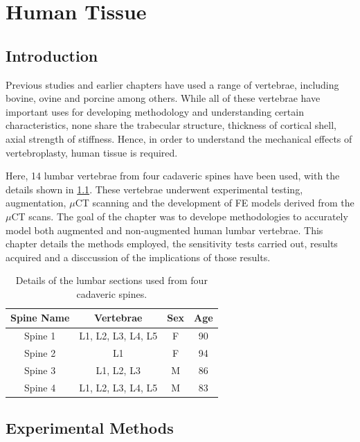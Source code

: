 \chapter{Human Tissue} \label{Chapter_HT}

\section{Introduction}

Previous studies and earlier chapters have used a range of vertebrae, including
bovine, ovine and porcine among others. While all of these vertebrae have
important uses for developing methodology and understanding certain
characteristics, none share the trabecular structure, thickness of cortical
shell, axial strength of stiffness. Hence, in order to understand the
mechanical effects of vertebroplasty, human tissue is required.

Here, 14 lumbar vertebrae from four cadaveric spines have been used, with the
details shown in \cref{tab:vertebrae}. These vertebrae underwent experimental
testing, augmentation, $\mu$CT scanning and the development of FE models
derived from the $\mu$CT scans. The goal of the chapter was to develope
methodologies to accurately model both augmented and non-augmented human lumbar
vertebrae. This chapter details the methods employed, the sensitivity tests
carried out, results acquired and a disccussion of the implications of those
results.

\begin{table}[ht!]
\centering
  \caption{Details of the lumbar sections used from four cadaveric spines.}
  \label{tab:vertebrae}
  \begin{tabular}{c|c|c|c}
    Spine Name & Vertebrae & Sex & Age \\ \hline \hline
    Spine 1& L1, L2, L3, L4, L5 & F & 90\\ \hline
    Spine 2& L1 & F & 94\\ \hline
    Spine 3& L1, L2, L3 & M & 86\\ \hline
    Spine 4& L1, L2, L3, L4, L5 & M & 83\\ \hline

  \end{tabular}

\end{table}


\section{Experimental Methods}

